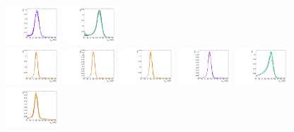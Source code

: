 \begin{figure}[htbp]
  \includegraphics[width=0.18\textwidth]{fig/2Dfit/templateSignalVsMX_fromDC_WprToWZ_MJJ_mu_LP_bb_HDy.pdf}
  \includegraphics[width=0.18\textwidth]{fig/2Dfit/templateSignalVsMX_fromDC_WprToWH_MJJ_mu_LP_bb_HDy.pdf}\\
  \includegraphics[width=0.18\textwidth]{fig/2Dfit/templateSignalVsMX_fromDC_GbuToWW_MJJ_mu_HP_nobb_HDy.pdf}
  \includegraphics[width=0.18\textwidth]{fig/2Dfit/templateSignalVsMX_fromDC_RadToWW_MJJ_mu_HP_nobb_HDy.pdf}
  \includegraphics[width=0.18\textwidth]{fig/2Dfit/templateSignalVsMX_fromDC_ZprToWW_MJJ_mu_HP_nobb_HDy.pdf}
  \includegraphics[width=0.18\textwidth]{fig/2Dfit/templateSignalVsMX_fromDC_WprToWZ_MJJ_mu_HP_nobb_HDy.pdf}
  \includegraphics[width=0.18\textwidth]{fig/2Dfit/templateSignalVsMX_fromDC_WprToWH_MJJ_mu_HP_nobb_HDy.pdf}\\
  \includegraphics[width=0.18\textwidth]{fig/2Dfit/templateSignalVsMX_fromDC_GbuToWW_MJJ_mu_LP_nobb_HDy.pdf}

\end{figure}
